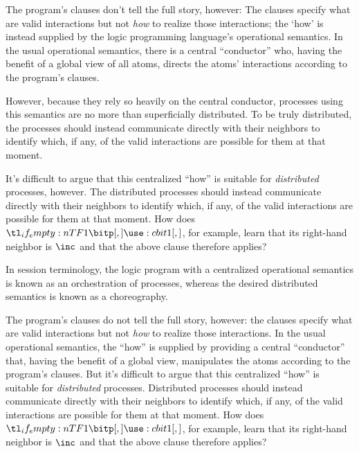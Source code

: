 The program's clauses don't tell the full story, however:
The clauses specify what are valid interactions but not \emph{how} to realize those interactions; the \enquote*{how} is instead supplied by the logic programming language's operational semantics.
In the usual operational semantics, there is a central \enquote{conductor} who, having the benefit of a global view of all atoms, directs the atoms' interactions according to the program's clauses.

However, because they rely so heavily on the central conductor, processes using this semantics are no more than superficially distributed.
To be truly distributed, the processes should instead communicate directly with their neighbors to identify which, if any, of the valid interactions are possible for them at that moment.

It's difficult to argue that this centralized \enquote{how} is suitable for \emph{distributed} processes, however.
The distributed processes should instead communicate directly with their neighbors to identify which, if any, of the valid interactions are possible for them at that moment.
How does $\bit{1}$, for example, learn that its right-hand neighbor is $\inc$ and that the above clause therefore applies?

In session terminology, the logic program with a centralized operational semantics is known as an orchestration of processes, whereas the desired distributed semantics is known as a choreography.




The program's clauses do not tell the full story, however: the clauses specify what are valid interactions but not \emph{how} to realize those interactions.
In the usual operational semantics, the \enquote{how} is supplied by providing a central \enquote{conductor} that, having the benefit of a global view, manipulates the atoms according to the program's clauses.
But it's difficult to argue that this centralized \enquote{how} is suitable for \emph{distributed} processes.
Distributed processes should instead communicate directly with their neighbors to identify which, if any, of the valid interactions are possible for them at that moment.
How does $\bit{1}$, for example, learn that its right-hand neighbor is $\inc$ and that the above clause therefore applies?






